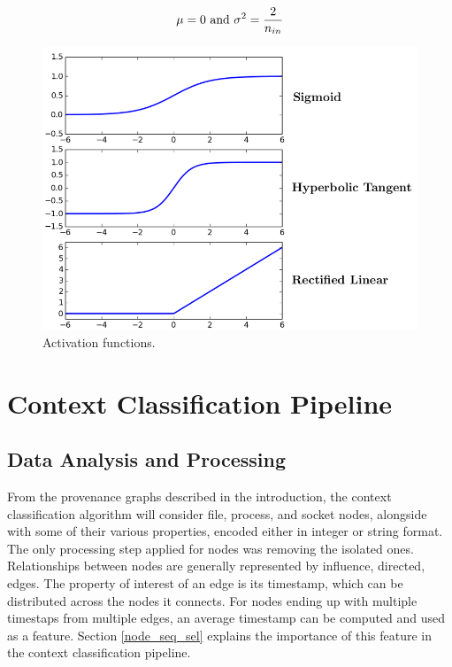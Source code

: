 \begin{equation}
  \centering
  \mu = 0 \ \text{and} \ \sigma^2 = \frac{2}{n_{in}}
\end{equation}

\bigskip

\begin{figure}[H]
  \centering
  \includegraphics[scale=0.4]{Images/activation_functions.png}
  \caption{Activation functions.}
  \label{activation_functions}
\end{figure}

\section{Context Classification Pipeline}
\subsection{Data Analysis and Processing}

From the provenance graphs described in the introduction, the context classification algorithm will consider file, process, and socket nodes, alongside with some of their various properties, encoded either in integer or string format. The only processing step applied for nodes was removing the isolated ones. Relationships between nodes are generally represented by influence, directed, edges. The property of interest of an edge is its timestamp, which can be distributed across the nodes it connects. For nodes ending up with multiple timestaps from multiple edges, an average timestamp can be computed and used as a feature. Section \ref{node_seq_sel} explains the importance of this feature in the context classification pipeline. \\

